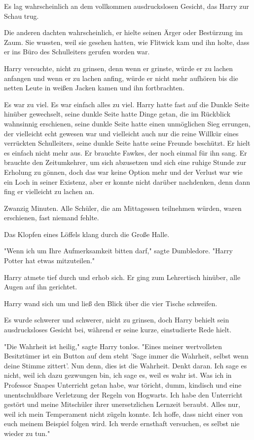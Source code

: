 {Es lag wahrscheinlich an dem vollkommen ausdruckslosen Gesicht, das Harry zur Schau trug.

Die anderen dachten wahrscheinlich, er hielte seinen Ärger oder Bestürzung im Zaum. Sie wussten, weil sie gesehen hatten, wie Flitwick kam und ihn holte, dass er ins Büro des Schulleiters gerufen worden war.

Harry versuchte, nicht zu grinsen, denn wenn er grinste, würde er zu lachen anfangen und wenn er zu lachen anfing, würde er nicht mehr aufhören bis die netten Leute in weißen Jacken kamen und ihn fortbrachten.

Es war zu viel. Es war einfach alles zu viel. Harry hatte fast auf die Dunkle Seite hinüber gewechselt, seine dunkle Seite hatte Dinge getan, die im Rückblick wahnsinnig erschienen, seine dunkle Seite hatte einen unmöglichen Sieg errungen, der vielleicht echt gewesen war und vielleicht auch nur die reine Willkür eines verrückten Schulleiters, seine dunkle Seite hatte seine Freunde beschützt. Er hielt es einfach nicht mehr aus. Er brauchte Fawkes, der noch einmal für ihn sang. Er brauchte den Zeitumkehrer, um sich abzusetzen und sich eine ruhige Stunde zur Erholung zu gönnen, doch das war keine Option mehr und der Verlust war wie ein Loch in seiner Existenz, aber er konnte nicht darüber nachdenken, denn dann fing er vielleicht zu lachen an.

Zwanzig Minuten. Alle Schüler, die am Mittagessen teilnehmen würden, waren erschienen, fast niemand fehlte.

Das Klopfen eines Löffels klang durch die Große Halle.

"Wenn ich um Ihre Aufmerksamkeit bitten darf," sagte Dumbledore. "Harry Potter hat etwas mitzuteilen."

Harry atmete tief durch und erhob sich. Er ging zum Lehrertisch hinüber, alle Augen auf ihn gerichtet.

Harry wand sich um und ließ den Blick über die vier Tische schweifen.

Es wurde schwerer und schwerer, nicht zu grinsen, doch Harry behielt sein ausdrucksloses Gesicht bei, während er seine kurze, einstudierte Rede hielt.

"Die Wahrheit ist heilig," sagte Harry tonlos. "Eines meiner wertvollsten Besitztümer ist ein Button auf dem steht 'Sage immer die Wahrheit, selbst wenn deine Stimme zittert'. Nun denn, dies ist die Wahrheit. Denkt daran. Ich sage es nicht, weil ich dazu gezwungen bin, ich sage es, weil es wahr ist. Was ich in Professor Snapes Unterricht getan habe, war töricht, dumm, kindisch und eine unentschuldbare Verletzung der Regeln von Hogwarts. Ich habe den Unterricht gestört und meine Mitschüler ihrer unersetzlichen Lernzeit beraubt. Alles nur, weil ich mein Temperament nicht zügeln konnte. Ich hoffe, dass nicht einer von euch meinem Beispiel folgen wird. Ich werde ernsthaft versuchen, es selbst nie wieder zu tun."

}
